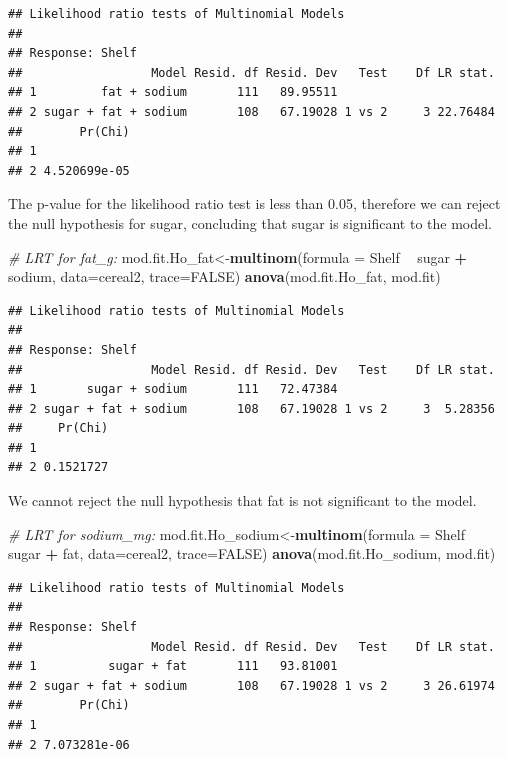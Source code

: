 \documentclass[11pt,]{article}
\newenvironment{Shaded}{\begin{snugshade}}{\end{snugshade}}
\newcommand{\KeywordTok}[1]{\textcolor[rgb]{0.13,0.29,0.53}{\textbf{#1}}}
\newcommand{\DataTypeTok}[1]{\textcolor[rgb]{0.13,0.29,0.53}{#1}}
\newcommand{\StringTok}[1]{\textcolor[rgb]{0.31,0.60,0.02}{#1}}
\newcommand{\CommentTok}[1]{\textcolor[rgb]{0.56,0.35,0.01}{\textit{#1}}}
\newcommand{\OtherTok}[1]{\textcolor[rgb]{0.56,0.35,0.01}{#1}}
\newcommand{\OperatorTok}[1]{\textcolor[rgb]{0.81,0.36,0.00}{\textbf{#1}}}
\newcommand{\NormalTok}[1]{#1}
\begin{document}
\begin{verbatim}
## Likelihood ratio tests of Multinomial Models
## 
## Response: Shelf
##                  Model Resid. df Resid. Dev   Test    Df LR stat.
## 1         fat + sodium       111   89.95511                      
## 2 sugar + fat + sodium       108   67.19028 1 vs 2     3 22.76484
##        Pr(Chi)
## 1             
## 2 4.520699e-05
\end{verbatim}

The p-value for the likelihood ratio test is less than 0.05, therefore
we can reject the null hypothesis for sugar, concluding that sugar is
significant to the model.

\begin{Shaded}
\begin{Highlighting}[]
\CommentTok{# LRT for fat_g:}
\NormalTok{mod.fit.Ho_fat<-}\KeywordTok{multinom}\NormalTok{(}\DataTypeTok{formula =}\NormalTok{ Shelf }\OperatorTok{~}\StringTok{ }\NormalTok{sugar }\OperatorTok{+}\StringTok{ }\NormalTok{sodium, }\DataTypeTok{data=}\NormalTok{cereal2, }\DataTypeTok{trace=}\OtherTok{FALSE}\NormalTok{)}
\KeywordTok{anova}\NormalTok{(mod.fit.Ho_fat, mod.fit)   }
\end{Highlighting}
\end{Shaded}

\begin{verbatim}
## Likelihood ratio tests of Multinomial Models
## 
## Response: Shelf
##                  Model Resid. df Resid. Dev   Test    Df LR stat.
## 1       sugar + sodium       111   72.47384                      
## 2 sugar + fat + sodium       108   67.19028 1 vs 2     3  5.28356
##     Pr(Chi)
## 1          
## 2 0.1521727
\end{verbatim}

We cannot reject the null hypothesis that fat is not significant to the
model.

\begin{Shaded}
\begin{Highlighting}[]
\CommentTok{# LRT for sodium_mg:}
\NormalTok{mod.fit.Ho_sodium<-}\KeywordTok{multinom}\NormalTok{(}\DataTypeTok{formula =}\NormalTok{ Shelf }\OperatorTok{~}\StringTok{ }\NormalTok{sugar }\OperatorTok{+}\StringTok{ }\NormalTok{fat, }\DataTypeTok{data=}\NormalTok{cereal2, }\DataTypeTok{trace=}\OtherTok{FALSE}\NormalTok{)}
\KeywordTok{anova}\NormalTok{(mod.fit.Ho_sodium, mod.fit)   }
\end{Highlighting}
\end{Shaded}

\begin{verbatim}
## Likelihood ratio tests of Multinomial Models
## 
## Response: Shelf
##                  Model Resid. df Resid. Dev   Test    Df LR stat.
## 1          sugar + fat       111   93.81001                      
## 2 sugar + fat + sodium       108   67.19028 1 vs 2     3 26.61974
##        Pr(Chi)
## 1             
## 2 7.073281e-06
\end{verbatim}
\end{document}
